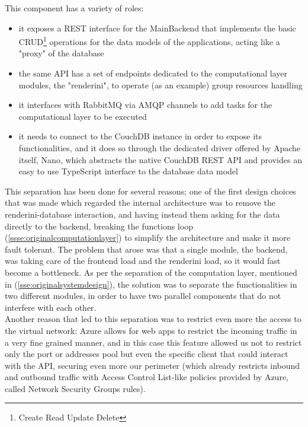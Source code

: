 \begin{enumerate}
      This component has a variety of roles:
      \begin{itemize}
        \item it exposes a REST interface for the MainBackend that implements the basic CRUD\footnote{Create Read Update Delete} operations for the data models of the applications, acting like a "proxy" of the database
        \item the same API has a set of endpoints dedicated to the computational layer modules, the "renderini", to operate (as an example) group resources handling
        \item it interfaces with RabbitMQ via AMQP channels to add tasks for the computational layer to be executed
        \item it needs to connect to the CouchDB instance in order to expose its functionalities, and it does so through the dedicated driver offered by Apache itself, Nano, which abstracts the native CouchDB REST API and provides an easy to use TypeScript interface to the database data model
      \end{itemize}
  \end{enumerate}
  This separation has been done for several reasons; one of the first design choices that was made which regarded the internal architecture was to remove the renderini-database interaction, and having instead them asking for the data directly to the backend, breaking the functions loop (\ref{ssse:originalcomputationlayer}) to simplify the architecture and make it more fault tolerant. The problem that arose was that a single module, the backend, was taking care of the frontend load and the renderini load, so it would fast become a bottleneck. As per the separation of the computation layer, mentioned in (\ref{sse:originalsystemdesign}), the solution was to separate the functionalities in two different modules, in order to have two parallel components that do not interfere with each other.\\
  Another reason that led to this separation was to restrict even more the access to the virtual network: Azure allows for web apps to restrict the incoming traffic in a very fine grained manner, and in this case this feature allowed us not to restrict only the port or addresses pool but even the specific client that could interact with the API, securing even more our perimeter (which already restricts inbound and outbound traffic with Access Control List-like policies provided by Azure, called Network Security Groups rules).
